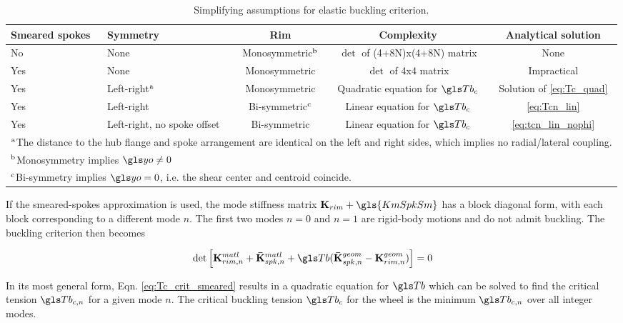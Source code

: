 \documentclass[\rootdir/thesis.tex]{subfiles}
\begin{document}
\begin{table}[h]
\caption{Simplifying assumptions for elastic buckling criterion.}
\label{tab:BucklingSolutions}
\begin{tabularx}{\textwidth}{p{1.2cm}Xccc}
\toprule
\centering Smeared spokes & \centering Symmetry & Rim & Complexity & Analytical solution\\
\midrule
\centering No  & \centering None & Monosymmetric$^{\rm b}$ & $\det$ of (4+8N)x(4+8N) matrix & None\\
\centering Yes & \centering None & Monosymmetric & $\det$ of 4x4 matrix & Impractical\\
\centering Yes & \centering Left-right$^{\rm a}$& Monosymmetric& Quadratic equation for $\Tb_c$ & Solution of \eqref{eq:Tc_quad}\\
\centering Yes & \centering Left-right& Bi-symmetric$^{\rm c}$ & Linear equation for $\Tb_c$ & \eqref{eq:Tcn_lin}\\
\centering Yes & \centering Left-right, no spoke offset & Bi-symmetric & Linear equation for $\Tb_c$ & \eqref{eq:tcn_lin_nophi}\\
\bottomrule
\multicolumn{5}{p{\textwidth}}{
$^{\rm a}$The distance to the hub flange and spoke arrangement are identical on the left and right sides, which implies no radial/lateral coupling.
}\\
\multicolumn{5}{p{\textwidth}}{
$^{\rm b}$Monosymmetry implies $\yo\neq 0$
}\\
\multicolumn{5}{p{\textwidth}}{
$^{\rm c}$Bi-symmetry implies $\yo=0$, i.e. the shear center and centroid coincide.
}\\
\bottomrule
\end{tabularx}
\end{table}


If the smeared-spokes approximation is used, the mode stiffness matrix $\KmRim + \gls{KmSpkSm}$ has a block diagonal form, with each block corresponding to a different mode $n$. The first two modes $n=0$ and $n=1$ are rigid-body motions and do not admit buckling. The buckling criterion then becomes

\begin{equation}
\label{eq:Tc_crit_smeared}
\det{\left[\matl{\mathbf{K}_{rim,n}} + \matl{\mathbf{\bar{K}}_{spk,n}} + \Tb(\geom{\mathbf{\bar{K}}_{spk,n}} - \geom{\mathbf{K}_{rim,n}})\right]} = 0
\end{equation}

In its most general form, Eqn. \eqref{eq:Tc_crit_smeared} results in a quadratic equation for $\Tb$ which can be solved to find the critical tension $\Tb_{c,n}$ for a given mode $n$. The critical buckling tension $\Tb_c$ for the wheel is the minimum $\Tb_{c,n}$ over all integer modes.
\end{document}
